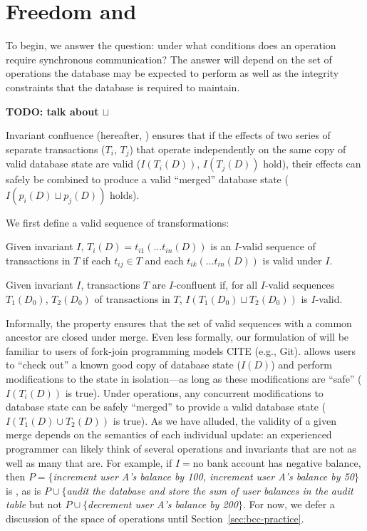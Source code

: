 
\section{Freedom and \iconfluence}
\label{sec:bcc-theory}

To begin, we answer the question: under what conditions does an
operation require synchronous communication? The answer will
depend on the set of operations the database may be expected to
perform as well as the integrity constraints that the database is
required to maintain.

\textbf{TODO: talk about $\sqcup$}

Invariant confluence (hereafter, \iconfluence) ensures that if the
effects of two series of separate transactions ($T_i$, $T_j$) that
operate independently on the same copy of valid database state are
valid ($I(T_i(D))$, $I(T_j(D))$ hold), their effects can safely be
combined to produce a valid ``merged'' database state ($I(p_i(D)
\sqcup p_j(D))$ holds).

We first define a valid sequence of transformations:

\begin{definition}
Given invariant $I$, $T_i(D) = t_{i1}(\dots t_{in}(D))$ is an
$I$-valid sequence of transactions in $T$ if each $t_{ij} \in T$ and
each $t_{ik}(\dots t_{in}(D))$ is valid under $I$.
\end{definition}

\begin{definition}[\iconfluence]
Given invariant $I$, transactions $T$ are $I$-confluent if, for all
$I$-valid sequences $T_1(D_0)$, $T_2(D_0)$ of transactions in $T$,
$I(T_1(D_0) \sqcup T_2(D_0))$ is $I$-valid.
\end{definition}

Informally, the \iconfluence property ensures that the set of valid
sequences with a common ancestor are closed under merge. Even less
formally, our formulation of \iconfluence will be familiar to users of
fork-join programming models CITE (e.g., Git). \iconfluence allows
users to ``check out'' a known good copy of database state ($I(D)$)
and perform modifications to the state in isolation---as long as these
modifications are ``safe'' ($I(T_i(D))$ is true). Under \iconfluent
operations, any concurrent modifications to database state can be
safely ``merged'' to provide a valid database state ($I(T_1(D) \cup
T_2(D))$ is true). As we have alluded, the validity of a given merge
depends on the semantics of each individual update: an experienced
programmer can likely think of several operations and invariants that
are not \iconfluent as well as many that are. For example, if $I=$no
bank account has negative balance, then $P=\{$\textit{increment user
  A's balance by 100, increment user A's balance by 50}$\}$ is
\iconfluent, as is $P\cup\{$\textit{audit the database and store the
  sum of user balances in the \textrm{audit} table} but not
$P\cup\{$\textit{decrement user A's balance by 200}$\}$. For now, we
defer a discussion of the space of operations until
Section~\ref{sec:bcc-practice}.

